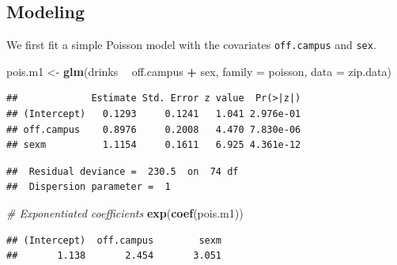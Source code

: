 \documentclass[
]{krantz}
\newenvironment{Shaded}{\begin{snugshade}}{\end{snugshade}}
\newcommand{\CommentTok}[1]{\textcolor[rgb]{0.37,0.37,0.37}{\textit{#1}}}
\newcommand{\DataTypeTok}[1]{\textcolor[rgb]{0.27,0.27,0.27}{#1}}
\newcommand{\DecValTok}[1]{\textcolor[rgb]{0.06,0.06,0.06}{#1}}
\newcommand{\KeywordTok}[1]{\textcolor[rgb]{0.27,0.27,0.27}{\textbf{#1}}}
\newcommand{\NormalTok}[1]{#1}
\newcommand{\OperatorTok}[1]{\textcolor[rgb]{0.43,0.43,0.43}{\textbf{#1}}}
\newcommand{\StringTok}[1]{\textcolor[rgb]{0.5,0.5,0.5}{#1}}
\begin{document}
\hypertarget{modeling}{%
\subsection{Modeling}\label{modeling}}

We first fit a simple Poisson model with the covariates \texttt{off.campus} and \texttt{sex}.

\begin{Shaded}
\begin{Highlighting}[]
\NormalTok{pois.m1 <-}\StringTok{ }\KeywordTok{glm}\NormalTok{(drinks }\OperatorTok{~}\StringTok{ }\NormalTok{off.campus }\OperatorTok{+}\StringTok{ }\NormalTok{sex, }\DataTypeTok{family =}\NormalTok{ poisson,}
               \DataTypeTok{data =}\NormalTok{ zip.data)}
\end{Highlighting}
\end{Shaded}

\begin{verbatim}
##             Estimate Std. Error z value  Pr(>|z|)
## (Intercept)   0.1293     0.1241   1.041 2.976e-01
## off.campus    0.8976     0.2008   4.470 7.830e-06
## sexm          1.1154     0.1611   6.925 4.361e-12
\end{verbatim}

\begin{verbatim}
##  Residual deviance =  230.5  on  74 df 
##  Dispersion parameter =  1
\end{verbatim}

\begin{Shaded}
\begin{Highlighting}[]
\CommentTok{# Exponentiated coefficients}
\KeywordTok{exp}\NormalTok{(}\KeywordTok{coef}\NormalTok{(pois.m1))}
\end{Highlighting}
\end{Shaded}

\begin{verbatim}
## (Intercept)  off.campus        sexm 
##       1.138       2.454       3.051
\end{verbatim}

\begin{Shaded}
\end{Shaded}
\end{document}
